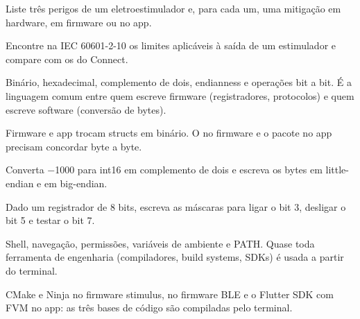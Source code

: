 \begin{pratique}
  \item Liste três perigos de um eletroestimulador e, para cada um, uma mitigação em hardware, em firmware ou no app.
  \item Encontre na IEC 60601-2-10 os limites aplicáveis à saída de um estimulador e compare com os do Connect.
\end{pratique}

Binário, hexadecimal, complemento de dois, endianness e operações bit a bit. É a linguagem comum entre quem escreve firmware (registradores, protocolos) e quem escreve software (conversão de bytes).

\begin{noproduto}
Firmware e app trocam structs em binário. O  no firmware e o pacote  no app precisam concordar byte a byte.
\end{noproduto}

\begin{paraestudar}
  \item {}
  \item {}
  \item {}
\end{paraestudar}

\begin{pratique}
  \item Converta −1000 para int16 em complemento de dois e escreva os bytes em little-endian e em big-endian.
  \item Dado um registrador de 8 bits, escreva as máscaras para ligar o bit 3, desligar o bit 5 e testar o bit 7.
\end{pratique}

Shell, navegação, permissões, variáveis de ambiente e PATH. Quase toda ferramenta de engenharia (compiladores, build systems, SDKs) é usada a partir do terminal.

\begin{noproduto}
CMake e Ninja no firmware stimulus,  no firmware BLE e o Flutter SDK com FVM no app: as três bases de código são compiladas pelo terminal.
\end{noproduto}

